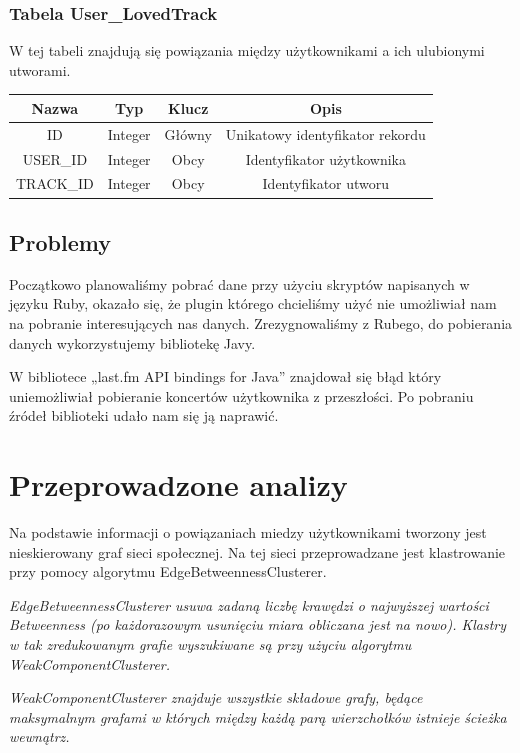 \documentclass[10pt,a4paper,epic,carom]{article}
\begin{document}
\subsubsection{Tabela User\_LovedTrack}
W tej tabeli znajdują się powiązania między użytkownikami a ich ulubionymi utworami.

\begin{table}[H]
  \centering
    \begin{tabular}{cccc}
    \addlinespace
    \toprule
    Nazwa & Typ   & Klucz & Opis \\
    \midrule
    ID    & Integer & Główny & Unikatowy identyfikator rekordu \\
    USER\_ID & Integer & Obcy  & Identyfikator użytkownika \\
    TRACK\_ID & Integer & Obcy  & Identyfikator utworu \\
    \bottomrule
    \end{tabular}
  \label{tab:addlabel}
\end{table}

\subsection{Problemy}
Początkowo planowaliśmy pobrać dane przy użyciu skryptów napisanych w języku Ruby, okazało się, że plugin którego chcieliśmy użyć nie umożliwiał nam na pobranie interesujących nas danych. Zrezygnowaliśmy z Rubego, do pobierania danych wykorzystujemy bibliotekę Javy.

W bibliotece „last.fm API bindings for Java” znajdował się błąd który uniemożliwiał pobieranie koncertów użytkownika z przeszłości. Po pobraniu źródeł biblioteki udało nam się ją naprawić.

\section{Przeprowadzone analizy}
Na podstawie informacji o powiązaniach miedzy użytkownikami tworzony jest nieskierowany graf sieci społecznej. Na tej sieci przeprowadzane jest klastrowanie przy pomocy algorytmu EdgeBetweennessClusterer.

{\itshape EdgeBetweennessClusterer usuwa zadaną liczbę krawędzi o najwyższej wartości Betweenness (po każdorazowym usunięciu miara obliczana jest na nowo). Klastry w tak zredukowanym grafie wyszukiwane są przy użyciu algorytmu WeakComponentClusterer.}

{\itshape WeakComponentClusterer znajduje wszystkie składowe grafy, będące maksymalnym grafami w których między każdą parą wierzchołków istnieje ścieżka wewnątrz.}
\end{document}
